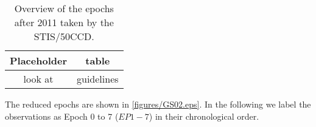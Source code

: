 \documentclass{aa}
\begin{document}
\begin{table}[ht]
    \centering
    \caption{Overview of the epochs after 2011 taken by the STIS/50CCD.}
    \label{tab:epoch_info}
    \begin{tabular}{c|c}
        Placeholder & table \\ \hline
        look at & guidelines
    \end{tabular}
\end{table}

The reduced epochs are shown in \autoref{figures/GS02.eps}. In the following we label the observations as Epoch 0 to 7 ($EP{1-7}$) in their chronological order.

\end{document}
